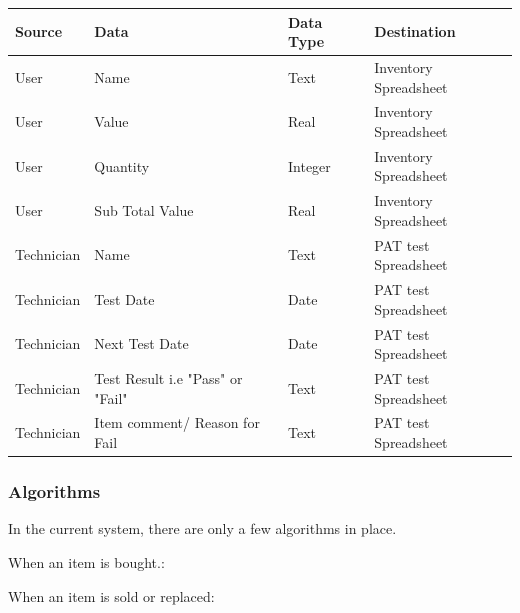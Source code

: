 \begin{center}
        \begin{tabular}{|p{2cm}|p{3cm}|p{3cm}|p{4cm}|}
            \hline
            \textbf{Source} & \textbf{Data} & \textbf{Data Type} & \textbf{Destination} \\ \hline
            User & Name & Text & Inventory Spreadsheet \\ \hline
            User & Value & Real & Inventory Spreadsheet \\ \hline
            User & Quantity & Integer & Inventory Spreadsheet \\ \hline
            User & Sub Total Value  & Real & Inventory Spreadsheet \\ \hline
            Technician & Name & Text & PAT test Spreadsheet \\ \hline
            Technician & Test Date & Date & PAT test Spreadsheet \\ \hline
            Technician & Next Test Date & Date & PAT test Spreadsheet \\ \hline
            Technician & Test Result i.e "Pass" or "Fail" & Text & PAT test Spreadsheet \\ \hline
            Technician & Item comment/ Reason for Fail & Text & PAT test Spreadsheet \\ \hline
        \end{tabular}
\end{center}

\subsubsection{Algorithms}

In the current system, there are only a few algorithms in place.
\bigskip

\begin{algorithm}[H]
    \caption{When an item is bought.:}
\begin{algorithmic}[1]
\EndIf
\end{algorithmic}
\end{algorithm}

\begin{algorithm}[H]
    \caption{When an item is sold or replaced:}
\begin{algorithmic}[1]
\EndIf
\end{algorithmic}
\end{algorithm}

